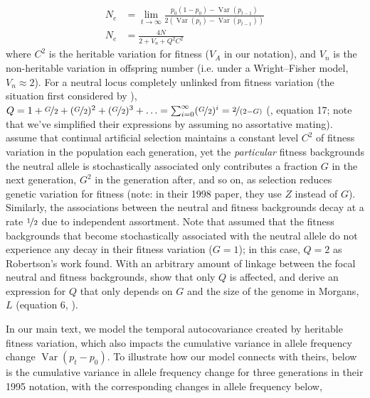 \documentclass[11pt]{article}
\DeclareMathOperator{\var}{Var}
\begin{document}
\begin{align}
  N_e &= \lim_{t \to \infty} \frac{p_0(1-p_0) - \var(p_{t-1})}{2(\var(p_t) - \var(p_{t-1}))}  \\
  N_e &= \frac{4N}{2 + V_n + Q^2 C^2}
\end{align}
%
where $C^2$ is the heritable variation for fitness ($V_A$ in our notation), and
$V_n$ is the non-heritable variation in offspring number (i.e. under a
Wright--Fisher model, $V_n \approx 2$). For a neutral locus completely unlinked
from fitness variation (the situation first considered by
\cite{Robertson1961-ho}), $Q = 1 + \nicefrac{G}{2} + (\nicefrac{G}{2})^2 +
(\nicefrac{G}{2})^3 + \ldots = \sum_{i=0}^\infty (\nicefrac{G}{2})^i =
\nicefrac{2}{(2 - G)}$ (\cite{Santiago1995-hx}, equation 17; note that we've
simplified their expressions by assuming no assortative mating).
\textcite{Santiago1995-hx} assume that continual artificial selection maintains
a constant level $C^2$ of fitness variation in the population each generation,
yet the \emph{particular} fitness backgrounds the neutral allele is
stochastically associated only contributes a fraction $G$ in the next
generation, $G^2$ in the generation after, and so on, as selection reduces
genetic variation for fitness (note: in their 1998 paper, they use $Z$ instead
of $G$). Similarly, the associations between the neutral and fitness
backgrounds decay at a rate $\nicefrac{1}{2}$ due to independent assortment.
Note that \textcite{Robertson1961-ho} assumed that the fitness backgrounds that
become stochastically associated with the neutral allele do not experience any
decay in their fitness variation ($G=1$); in this case, $Q = 2$ as Robertson's
work found. With an arbitrary amount of linkage between the focal neutral and
fitness backgrounds, \textcite{Santiago1998-bs} show that only $Q$ is affected,
and derive an expression for $Q$ that only depends on $G$ and the size of the
genome in Morgans, $L$ (equation 6, \citeyear{Santiago1998-bs}). 

In our main text, we model the temporal autocovariance created by heritable
fitness variation, which also impacts the cumulative variance in allele
frequency change $\var(p_t - p_0)$. To illustrate how our model connects with
theirs, below is the cumulative variance in allele frequency change for three
generations in their 1995 notation, with the corresponding changes in allele
frequency below,
\end{document}
